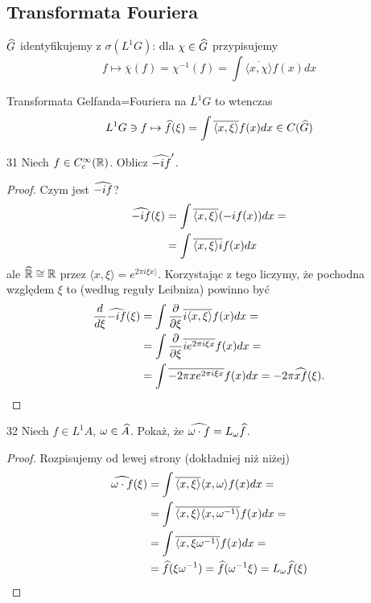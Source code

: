 \subsection{Transformata Fouriera}

$\Hat{G}$ identyfikujemy z $\sigma(L^1G)$: dla $\chi\in\Hat{G}$ przypisujemy
$$f\mapsto \overline{\chi}(f)=\chi^{-1}(f)=\int\overline{\langle x,\chi\rangle}f(x)dx$$

Transformata Gelfanda=Fouriera na $L^1G$ to wtenczas 
$$L^1G\ni f\mapsto \Hat{f}(\xi)=\int\overline{\langle x,\xi\rangle}f(x)dx\in C(\Hat{G})$$

\begin{zadanie}{3}{1}
  Niech $f\in C_c^\infty(\R)$. Oblicz $\Hat{-if}'$.
\end{zadanie}

\begin{proof}
  Czym jest $\Hat{-if}$? 
  \begin{align*}
    \Hat{-if}(\xi)&=\int \overline{\langle x,\xi\rangle}(-if(x))dx = \\ 
                  &=\int \overline{\langle x, \xi\rangle i}f(x)dx
  \end{align*}
  ale $\Hat{\R}\cong \R$ przez $\langle x,\xi\rangle=e^{2\pi i\xi x\rangle}$. Korzystając z tego liczymy, że pochodna względem $\xi$ to (według reguły Leibniza) powinno być
  \begin{align*}
    \frac{d}{d\xi}\Hat{-if}(\xi)&=\int \frac{\partial}{\partial \xi}\overline{i\langle x,\xi\rangle}f(x)dx=\\ 
                                &=\int \frac{\partial}{\partial\xi}\overline{i e^{2\pi i \xi x}}f(x)dx= \\ 
                                &=\int \overline{-2\pi x e^{2\pi i \xi x}}f(x)dx=-2\pi\Hat{xf}(\xi).
  \end{align*}
\end{proof}

\begin{zadanie}{3}{2}
  Niech $f\in L^1A$, $\omega\in\Hat{A}$. Pokaż, że $\Hat{\omega\cdot f}=L_\omega \Hat{f}$.
\end{zadanie}

\begin{proof}
  Rozpisujemy od lewej strony (dokładniej niż niżej)
  \begin{align*}
    \Hat{\omega\cdot f}(\xi)&=\int \overline{\langle x,\xi\rangle}\langle x,\omega\rangle f(x)dx=\\ 
                       &=\int \overline{\langle x,\xi\rangle\langle x,\omega^{-1}\rangle}f(x)dx=\\ 
                       &=\int \overline{\langle x,\xi\omega^{-1}\rangle}f(x)dx=\\ 
                       &=\Hat{f}(\xi\omega^{-1})=\Hat{f}(\omega^{-1}\xi)=L_{\omega}\Hat{f}(\xi)
  \end{align*}
\end{proof}

